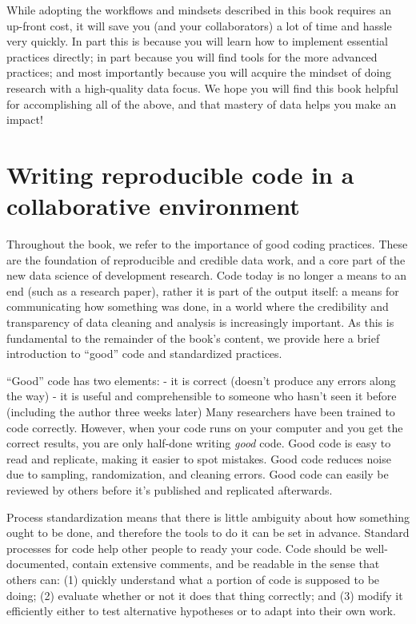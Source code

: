 While adopting the workflows and mindsets described in this book requires an up-front cost,
it will save you (and your collaborators) a lot of time and hassle very quickly.
In part this is because you will learn how to implement essential practices directly;
in part because you will find tools for the more advanced practices;
and most importantly because you will acquire the mindset of doing research with a high-quality data focus.
We hope you will find this book helpful for accomplishing all of the above,
and that mastery of data helps you make an impact!


\section{Writing reproducible code in a collaborative environment}
Throughout the book, we refer to the importance of good coding practices. 
These are the foundation of reproducible and credible data work,
and a core part of the new data science of development research.
Code today is no longer a means to an end (such as a research paper),
rather it is part of the output itself: a means for communicating how something was done,
in a world where the credibility and transparency of data cleaning and analysis is increasingly important.
As this is fundamental to the remainder of the book's content, 
we provide here a brief introduction to ``good'' code and standardized practices.

``Good'' code has two elements:
- it is correct (doesn't produce any errors along the way)
- it is useful and comprehensible to someone who hasn't seen it before (including the author three weeks later)
Many researchers have been trained to code correctly. 
However, when your code runs on your computer and you get the correct results, you are only half-done writing \textit{good} code.
Good code is easy to read and replicate, making it easier to spot mistakes.
Good code reduces noise due to sampling, randomization, and cleaning errors.
Good code can easily be reviewed by others before it's published and replicated afterwards.

Process standardization means that there is
little ambiguity about how something ought to be done,
and therefore the tools to do it can be set in advance.
Standard processes for code help other people to ready your code. 
Code should be well-documented, contain extensive comments, and be readable in the sense that others can:
(1) quickly understand what a portion of code is supposed to be doing;
(2) evaluate whether or not it does that thing correctly; and
(3) modify it efficiently either to test alternative hypotheses
or to adapt into their own work.

